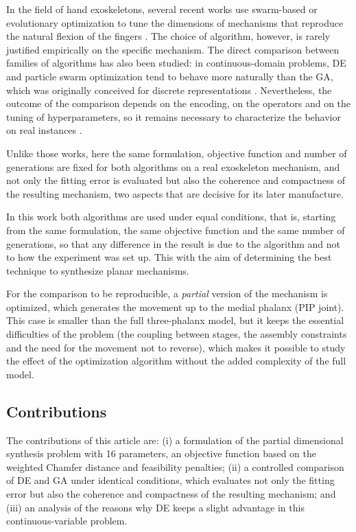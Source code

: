 In the field of hand exoskeletons, several recent works use swarm-based or
evolutionary optimization to tune the dimensions of mechanisms that reproduce the
natural flexion of the fingers \cite{ref_exo_review,ref_exo_stephenson}. The
choice of algorithm, however, is rarely justified empirically on the specific
mechanism. The direct comparison between families of algorithms has also been
studied: in continuous-domain problems, DE and particle swarm optimization tend
to behave more naturally than the GA, which was originally conceived for discrete
representations \cite{ref_ga_pso_de,ref_de_vs_ga}. Nevertheless, the outcome of
the comparison depends on the encoding, on the operators and on the tuning of
hyperparameters, so it remains necessary to characterize the behavior on real
instances \cite{ref_de_survey,ref_de_sade}.

Unlike those works, here the same formulation, objective function and number of
generations are fixed for both algorithms on a real exoskeleton mechanism, and
not only the fitting error is evaluated but also the coherence and compactness of
the resulting mechanism, two aspects that are decisive for its later manufacture.

In this work both algorithms are used under equal conditions, that is, starting
from the same formulation, the same objective function and the same number of
generations, so that any difference in the result is due to the algorithm and not
to how the experiment was set up. This with the aim of determining the best
technique to synthesize planar mechanisms.

For the comparison to be reproducible, a \emph{partial} version of the mechanism
is optimized, which generates the movement up to the medial phalanx (PIP joint).
This case is smaller than the full three-phalanx model, but it keeps the
essential difficulties of the problem (the coupling between stages, the assembly
constraints and the need for the movement not to reverse), which makes it
possible to study the effect of the optimization algorithm without the added
complexity of the full model.

\subsection{Contributions}
The contributions of this article are: (i) a formulation of the partial
dimensional synthesis problem with 16 parameters, an objective function based on
the weighted Chamfer distance and feasibility penalties; (ii) a controlled
comparison of DE and GA under identical conditions, which evaluates not only the
fitting error but also the coherence and compactness of the resulting mechanism;
and (iii) an analysis of the reasons why DE keeps a slight advantage in this
continuous-variable problem.
